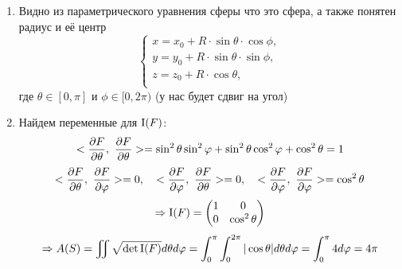 \documentclass[main]{subfiles}
\begin{document}
    \begin{sol}
      \begin{enumerate}
        \item Видно из параметрического уравнения сферы что это сфера, а также понятен радиус и её центр
        \[\begin{cases}
          x = x_0 + R \cdot \sin \theta\cdot \cos \phi,\\
          y = y_0 + R \cdot \sin \theta\cdot \sin \phi,\\
          z = z_0 + R \cdot \cos \theta,\\
        \end{cases}\]
        где $\theta \in [0, \pi]$ и $\phi \in [0, 2\pi)$ (у нас будет сдвиг на угол)
        \item Найдем переменные для $\RNumb{1}(F)$:
        \[<\frac{\partial F}{\partial \theta},\ \frac{\partial F}{\partial \theta}> = \sin^2 \theta \sin^2 \varphi + \sin^2 \theta \cos^2 \varphi + \cos^2 \theta = 1\]
        \[<\frac{\partial F}{\partial \theta},\ \frac{\partial F}{\partial \varphi}> = 0,\quad <\frac{\partial F}{\partial \varphi},\ \frac{\partial F}{\partial \theta}> = 0,\quad <\frac{\partial F}{\partial \varphi},\ \frac{\partial F}{\partial \varphi}> = \cos^2 \theta\]
        \[\Ra \RNumb{1}(F)=\begin{pmatrix}
          1 & 0\\
          0 & \cos^2 \theta
        \end{pmatrix}\]
        \[\Ra A(S) = \iint \sqrt{\det \RNumb{1}(F)} d\theta d\varphi = \int_0^\pi \int_0^{2\pi} |\cos \theta|d\theta d\varphi = \int_0^\pi 4 d\varphi = 4 \pi\]
      \end{enumerate}
    \end{sol}
\end{document}
